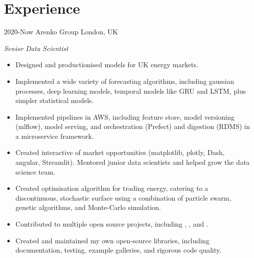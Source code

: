 \section{Experience}

\begin{entrylist}
\entry
{2020-Now}
{Arenko Group}
{London, UK}
{\emph{Senior Data Scientist}
\begin{itemize}
	\item Designed and productionised  models for UK energy markets.
    \item Implemented a wide variety of forecasting algorithms, including gaussian processes, deep learning models, 
temporal models like GRU and LSTM, plus simpler statistical models.
	\item Implemented  pipelines in AWS, including feature store, model versioning (mlflow), model serving, 
 and orchestration (Prefect) and digestion (RDMS) in a microservice framework.
	\item Created interactive  of market opportunities (matplotlib, plotly, Dash, angular, Streamlit).
	Mentored junior data scientists and helped grow the data science team.
	\item Created optimisation algorithm for trading energy, catering to a discontinuous, stochastic surface using a combination
	of particle swarm, genetic algorithms, and Monte-Carlo simulation.
	\item Contributed to multiple open source projects, including , ,  and .
	\item Created and maintained my own open-source libraries, including documentation, testing, example galleries, and rigorous code quality.
\end{itemize}
}


\end{entrylist}
